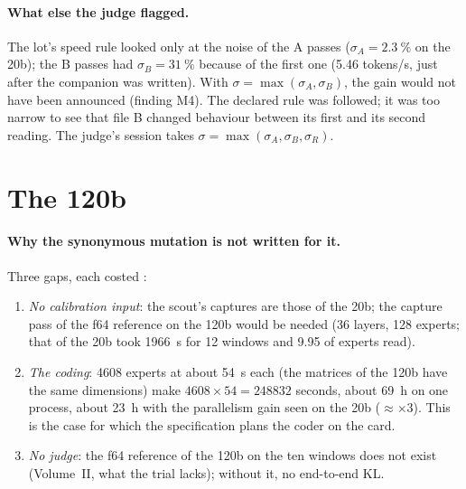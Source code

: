 \paragraph{What else the judge flagged.} The lot's speed rule looked only at the noise of the A passes ($\sigma_A = \SI{2.3}{\percent}$ on the 20b); the B passes had $\sigma_B = \SI{31}{\percent}$ because of the first one (\num{5.46} tokens/s, just after the companion was written). With $\sigma = \max(\sigma_A, \sigma_B)$, the gain would not have been announced (finding M4). The declared rule was followed; it was too narrow to see that file B changed behaviour between its first and its second reading. The judge's session takes $\sigma = \max(\sigma_A, \sigma_B, \sigma_R)$.

\section{The 120b}\label{t3sno:sec:120b}

\paragraph{Why the synonymous mutation is not written for it.} Three gaps, each costed \calc:
\begin{enumerate}
\item \emph{No calibration input}: the scout's captures are those of the 20b; the capture pass of the f64 reference on the 120b would be needed (36 layers, 128 experts; that of the 20b took \SI{1966}{\second} for 12 windows and \SI{9.95}{\Go} of experts read).
\item \emph{The coding}: \num{4608} experts at about \SI{54}{\second} each (the matrices of the 120b have the same dimensions) make $\num{4608} \times 54 = \num{248832}$ seconds, about \SI{69}{\hour} on one process, about \SI{23}{\hour} with the parallelism gain seen on the 20b ($\approx \times 3$). This is the case for which the specification plans the coder on the card.
\item \emph{No judge}: the f64 reference of the 120b on the ten windows does not exist (Volume~II, what the trial lacks); without it, no end-to-end KL.
\end{enumerate}

